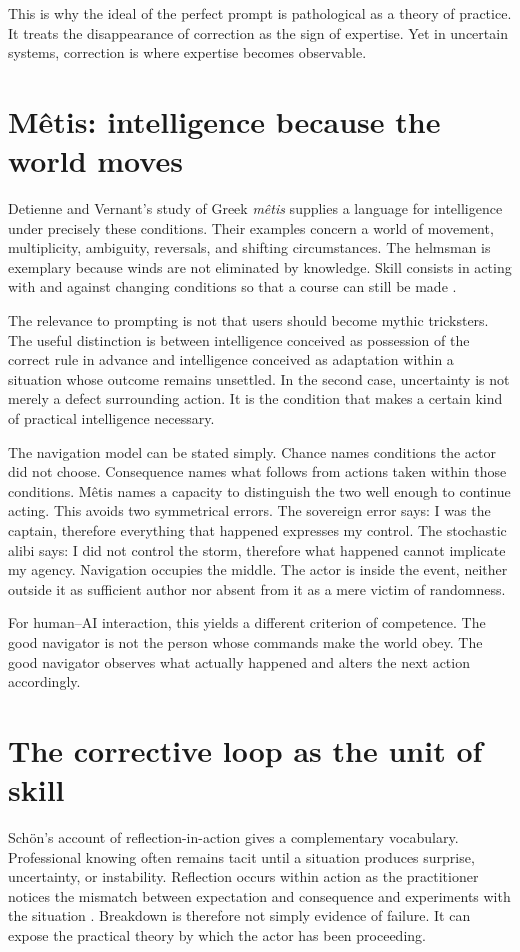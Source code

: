 \documentclass[11pt]{article}
\begin{document}
This is why the ideal of the perfect prompt is pathological as a theory of practice. It treats the disappearance of correction as the sign of expertise. Yet in uncertain systems, correction is where expertise becomes observable.

\section{M\^etis: intelligence because the world moves}
Detienne and Vernant's study of Greek \emph{m\^etis} supplies a language for intelligence under precisely these conditions. Their examples concern a world of movement, multiplicity, ambiguity, reversals, and shifting circumstances. The helmsman is exemplary because winds are not eliminated by knowledge. Skill consists in acting with and against changing conditions so that a course can still be made \citep{detienne1978}.

The relevance to prompting is not that users should become mythic tricksters. The useful distinction is between intelligence conceived as possession of the correct rule in advance and intelligence conceived as adaptation within a situation whose outcome remains unsettled. In the second case, uncertainty is not merely a defect surrounding action. It is the condition that makes a certain kind of practical intelligence necessary.

The navigation model can be stated simply. Chance names conditions the actor did not choose. Consequence names what follows from actions taken within those conditions. M\^etis names a capacity to distinguish the two well enough to continue acting. This avoids two symmetrical errors. The sovereign error says: I was the captain, therefore everything that happened expresses my control. The stochastic alibi says: I did not control the storm, therefore what happened cannot implicate my agency. Navigation occupies the middle. The actor is inside the event, neither outside it as sufficient author nor absent from it as a mere victim of randomness.

For human--AI interaction, this yields a different criterion of competence. The good navigator is not the person whose commands make the world obey. The good navigator observes what actually happened and alters the next action accordingly.

\section{The corrective loop as the unit of skill}
Sch\"on's account of reflection-in-action gives a complementary vocabulary. Professional knowing often remains tacit until a situation produces surprise, uncertainty, or instability. Reflection occurs within action as the practitioner notices the mismatch between expectation and consequence and experiments with the situation \citep{schon1983}. Breakdown is therefore not simply evidence of failure. It can expose the practical theory by which the actor has been proceeding.
\end{document}
